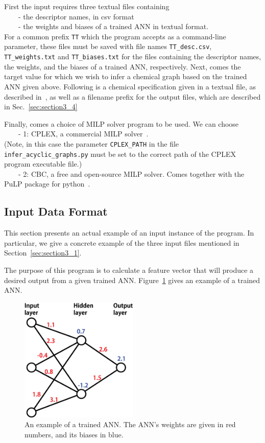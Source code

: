 \documentclass[11pt, titlepage, dvipdfmx, twoside]{article}
\begin{document}
First
the input requires three textual files containing \\
~~~~- the descriptor names, in csv format \\
~~~~- the weights and biases of a trained ANN in textual format.\\
For a common prefix {\tt TT} which the program accepts as a command-line parameter,
these files must be saved with file names {\tt TT\_desc.csv}, 
{\tt TT\_weights.txt} and {\tt TT\_biases.txt} for the files containing
the descriptor names, the weights, and the biases of a trained ANN, respectively.
%
Next, comes the target value for which we wish to infer 
a chemical graph based on the trained ANN given above.
Following is a chemical specification given in a textual file,
as described in~\cite{cyclic_BH_arxiv}, 
as well as a filename prefix for the output files,  which are described in Sec.~\ref{sec:section3_4}

Finally, comes a choice of MILP solver program to be used.
We can choose \\
~~~~- 1: CPLEX, a commercial MILP solver~\cite{cplex}. \\
(Note, in this case the parameter {\tt CPLEX\_PATH} in the file {\tt infer\_acyclic\_graphs.py}
must be set to the correct path of the CPLEX program executable file.) \\
~~~~- 2: CBC, a free and open-source MILP solver. Comes together with the PuLP package for python~\cite{PuLP1}.




\subsection{Input Data Format}
\label{sec:section3_2}

This section presents an actual example of an input instance of the program.
In particular, we give a concrete example of the three input files
mentioned in Section~\ref{sec:section3_1}.

The purpose of this program is to calculate a feature vector that will produce a desired output from a 
given trained ANN.
Figure~\ref{fig:sample} gives an example of a trained ANN.


\begin{figure}[H]
  \centering
  \includegraphics[width=0.5\textwidth]{./fig/ANN_sample_en}
  \caption{An example of a trained ANN.
		      The ANN's weights are given in red numbers, and
		      its biases in blue.
		    }
  \label{fig:sample}
\end{figure}
\end{document}
